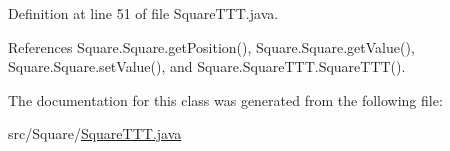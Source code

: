 Definition at line 51 of file Square\+T\+T\+T.\+java.



References Square.\+Square.\+get\+Position(), Square.\+Square.\+get\+Value(), Square.\+Square.\+set\+Value(), and Square.\+Square\+T\+T\+T.\+Square\+T\+T\+T().



The documentation for this class was generated from the following file\+:\begin{DoxyCompactItemize}
\item 
src/\+Square/\hyperlink{_square_t_t_t_8java}{Square\+T\+T\+T.\+java}\end{DoxyCompactItemize}
